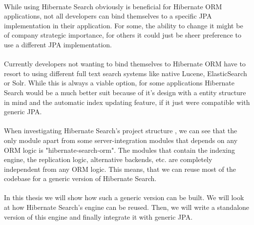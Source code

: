 \\
While using Hibernate Search obviously is beneficial for Hibernate ORM applications, not all developers can bind themselves to a specific JPA implementation in their application. For some, the ability to change it might be of company strategic importance, for others it could just be sheer preference to use a different JPA implementation.
\\\\
Currently developers not wanting to bind themselves to Hibernate ORM have to resort to using different full text search systems like native Lucene, ElasticSearch or Solr. While this is always a viable option, for some applications Hibernate Search would be a much better suit because of it's design with a entity structure in mind and the automatic index updating feature, if it just were compatible with generic JPA.
\\\\
When investigating Hibernate Search's project structure \cite{source-code-git}, we can see that the only module apart from some server-integration modules that depends on any ORM logic is "hibernate-search-orm". The modules that contain the indexing engine, the replication logic, alternative backends, etc. are completely independent from any ORM logic. This means, that we can reuse most of the codebase for a generic version of Hibernate Search.
\\\\
In this thesis we will show how such a generic version can be built. We will look at how Hibernate Search's engine can be reused. Then, we will write a standalone version of this engine and finally integrate it with generic JPA.

\pagebreak

